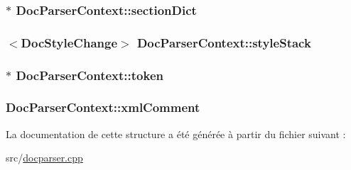 \subsubsection[{section\+Dict}]{$\ast$ Doc\+Parser\+Context\+::section\+Dict}\label{struct_doc_parser_context_a0e457c01f7cfa2b60d7af671cbf6fc9c}
\hypertarget{struct_doc_parser_context_af6fc30c2dd0edcf5fede2f271316546c}{}
\subsubsection[{style\+Stack}]{$<${\bf Doc\+Style\+Change}$>$ Doc\+Parser\+Context\+::style\+Stack}\label{struct_doc_parser_context_af6fc30c2dd0edcf5fede2f271316546c}
\hypertarget{struct_doc_parser_context_a8da54182d40bdc81e85cd29db88230b6}{}
\subsubsection[{token}]{$\ast$ Doc\+Parser\+Context\+::token}\label{struct_doc_parser_context_a8da54182d40bdc81e85cd29db88230b6}
\hypertarget{struct_doc_parser_context_a5b98ca02af34e324862e5b5b8bbfb207}{}
\subsubsection[{xml\+Comment}]{ Doc\+Parser\+Context\+::xml\+Comment}\label{struct_doc_parser_context_a5b98ca02af34e324862e5b5b8bbfb207}


La documentation de cette structure a été générée à partir du fichier suivant \+:\begin{DoxyCompactItemize}
\item 
src/\hyperlink{docparser_8cpp}{docparser.\+cpp}\end{DoxyCompactItemize}
